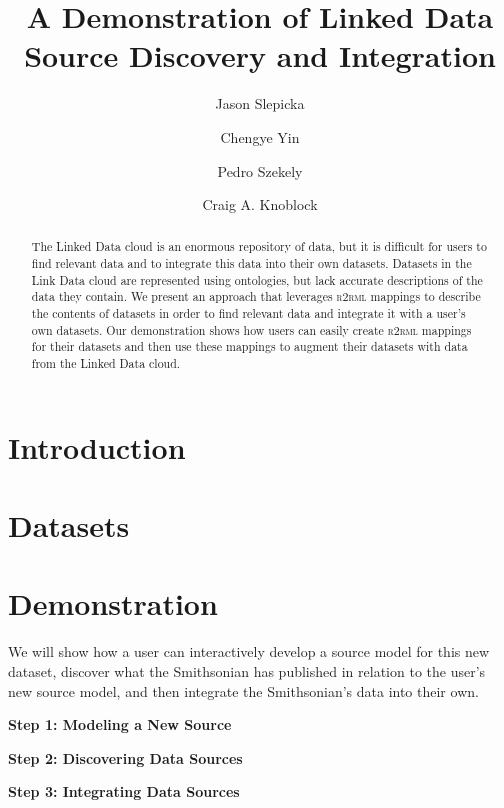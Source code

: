 \documentclass[runningheads,a4paper]{llncs}
\newcommand{\rtworml}{\textsc{r2rml}\xspace}
\begin{document}
\mainmatter  %
\title{A Demonstration of Linked Data Source Discovery and Integration}
%
\author{Jason Slepicka%
\and Chengye Yin\and Pedro Szekely\and Craig A. Knoblock}
%
\maketitle
\begin{abstract}
The Linked Data cloud is an enormous repository of data, but it is difficult for users to find relevant data and to integrate this data into their own datasets. 
Datasets in the Link Data cloud are represented using ontologies, but lack accurate descriptions of the data they contain.
We present an approach that leverages \rtworml mappings to describe the contents of datasets in order to find relevant data and integrate it with a user's own datasets.
Our demonstration shows how users can easily create \rtworml mappings for their datasets and then use these mappings to augment their datasets with data from the Linked Data cloud.
\end{abstract}

\section{Introduction} 

\section{Datasets}

\section{Demonstration}
We will show how a user can interactively develop a source model for this new dataset, discover what the Smithsonian has published in relation to the user's new source model, and then integrate the Smithsonian's data into their own.  

\textbf{Step 1: Modeling a New Source} 


\textbf{Step 2: Discovering Data Sources} 


\textbf{Step 3: Integrating Data Sources} 

\vspace{-5mm}


\end{document}
